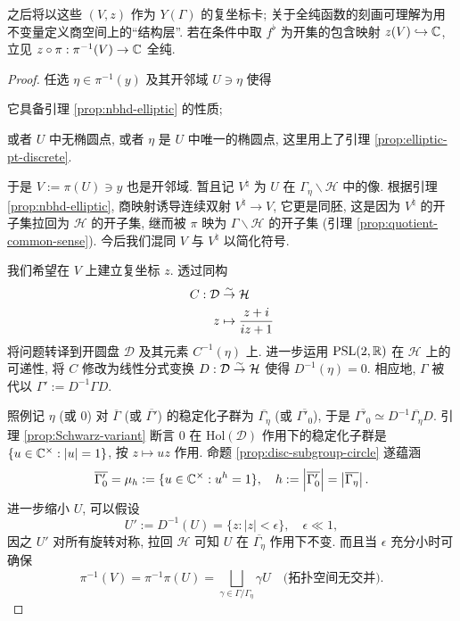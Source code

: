 之后将以这些 $(V, z)$ 作为 $Y(\Gamma)$ 的复坐标卡; 关于全纯函数的刻画可理解为用不变量定义商空间上的``结构层''. 若在条件中取 $f^\flat$ 为开集的包含映射 $z(V) \hookrightarrow \mathbb{C}$, 立见 $z \circ \pi: \pi^{-1}(V) \to \mathbb{C}$ 全纯.

\begin{proof}
	任选 $\eta \in \pi^{-1}(y)$ 及其开邻域 $U \ni \eta$ 使得
	\begin{compactitem}
		\item 它具备引理 \ref{prop:nbhd-elliptic} 的性质;
		\item 或者 $U$ 中无椭圆点, 或者 $\eta$ 是 $U$ 中唯一的椭圆点, 这里用上了引理 \ref{prop:elliptic-pt-discrete}.
	\end{compactitem}
	于是 $V := \pi(U) \ni y$ 也是开邻域. 暂且记 $V^\natural$ 为 $U$ 在 $\Gamma_\eta \backslash \mathcal{H}$ 中的像. 根据引理 \ref{prop:nbhd-elliptic}, 商映射诱导连续双射 $V^\natural \to V$, 它更是同胚, 这是因为 $V^\natural$ 的开子集拉回为 $\mathcal{H}$ 的开子集, 继而被 $\pi$ 映为 $\Gamma \backslash \mathcal{H}$ 的开子集 (引理 \ref{prop:quotient-common-sense}). 今后我们混同 $V$ 与 $V^\natural$ 以简化符号.
	
	我们希望在 $V$ 上建立复坐标 $z$. 透过同构
	\begin{align*}
		C: \mathcal{D} & \stackrel{\sim}{\rightarrow} \mathcal{H} \\
		z & \mapsto \dfrac{z+i}{iz+1}
	\end{align*}
	将问题转译到开圆盘 $\mathcal{D}$ 及其元素 $C^{-1}(\eta)$ 上. 进一步运用 $\operatorname{PSL}(2,\mathbb{R})$ 在 $\mathcal{H}$ 上的可递性, 将 $C$ 修改为线性分式变换 $D: \mathcal{D} \stackrel{\sim}{\rightarrow} \mathcal{H}$ 使得 $D^{-1}(\eta) = 0$. 相应地, $\Gamma$ 被代以 $\Gamma' := D^{-1}\Gamma D$.
	
	照例记 $\eta$ (或 $0$) 对 $\overline{\Gamma}$ (或 $\overline{\Gamma'}$) 的稳定化子群为 $\overline{\Gamma_\eta}$ (或 $\overline{\Gamma'_0}$), 于是 $\overline{\Gamma'_0} \simeq D^{-1} \overline{\Gamma_\eta} D$. 引理 \ref{prop:Schwarz-variant} 断言 $0$ 在 $\mathrm{Hol}(\mathcal{D})$ 作用下的稳定化子群是 $\{u \in \mathbb{C}^\times: |u|=1 \}$, 按 $z \mapsto uz$ 作用. 命题 \ref{prop:disc-subgroup-circle} 遂蕴涵
	\begin{equation}\label{eqn:chart-h}
		\overline{\Gamma'_0} = \mu_h := \{u \in \mathbb{C}^\times: u^h=1 \}, \quad h := \left| \overline{\Gamma'_0} \right| =  \left| \overline{\Gamma_\eta} \right|.
	\end{equation}
	进一步缩小 $U$, 可以假设
	\begin{equation*}
		U' := D^{-1}(U) = \{z : |z| < \epsilon \}, \quad \epsilon \ll 1,
	\end{equation*}
	因之 $U'$ 对所有旋转对称, 拉回 $\mathcal{H}$ 可知 $U$ 在 $\overline{\Gamma_\eta}$ 作用下不变. 而且当 $\epsilon$ 充分小时可确保
	\[ \pi^{-1}(V) = \pi^{-1} \pi(U) = \bigsqcup_{\gamma \in  \Gamma/\Gamma_{\eta}} \gamma U \quad \text{(拓扑空间无交并)}. \]
	

\end{proof}
